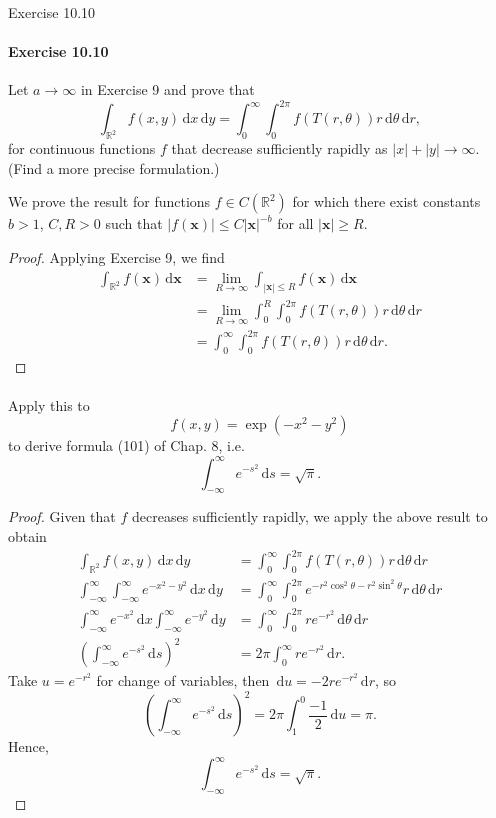 \documentclass[12pt]{article}
\newenvironment{fullbox}{\begin{lrbox}{\savefullbox}\begin{minipage}{\dimexpr\textwidth-2\fboxsep\relax}}{\end{minipage}\end{lrbox}\begin{center}\framebox[\textwidth]{\usebox{\savefullbox}}\end{center}}
\newenvironment{pbox}[1][]{\begin{fullbox}\ifx#1\empty\else\paragraph{#1}\fi}{\end{fullbox}}
\newcommand{\R}{\mathbb{R}}
\newcommand{\<}{\langle}
\renewcommand{\>}{\rangle}
\newcommand{\x}{\mathbf{x}}
\newcommand{\dd}[1]{\,\mathrm{d}#1}
\begin{document}
\newpage
\begin{pbox}[Exercise 10.10]
    Let $a\to \infty$ in Exercise 9 and prove that
    \[
        \int_{\R^2} f(x,y) \dd{x} \dd{y} = \int_{0}^{\infty} \int_{0}^{2\pi} f(T(r,\theta))r \dd{\theta} \dd{r},
    \]
    for continuous functions $f$ that decrease sufficiently rapidly as $|x|+|y|\to \infty$. (Find a more precise formulation.) 
\end{pbox}

We prove the result for functions $f \in C(\R^2)$ for which there exist constants $b > 1$, $C, R > 0$ such that $|f(\x)| \leq C|\x|^{-b}$ for all $|\x| \geq R$.

\begin{proof}
    Applying Exercise 9, we find
    \begin{align*}
        \int_{\R^2} f(\x) \dd{\x}
            &= \lim_{R \to \infty} \int_{|\x| \leq R} f(\x) \dd{\x} \\
            &= \lim_{R \to \infty} \int_{0}^{R} \int_{0}^{2\pi} f(T(r,\theta))r \dd{\theta} \dd{r} \\
            &= \int_{0}^{\infty} \int_{0}^{2\pi} f(T(r,\theta))r \dd{\theta} \dd{r}.
    \end{align*}

\end{proof}



\begin{pbox}
    Apply this to
    \[
        f(x,y) = \exp(-x^2-y^2)
    \]
    to derive formula (101) of Chap. 8, i.e.
    \[
        \int_{-\infty}^{\infty} e^{-s^2} \dd{s} = \sqrt{\pi}.
    \]
\end{pbox}

\begin{proof}
    Given that $f$ decreases sufficiently rapidly, we apply the above result to obtain
    \begin{align*}
        \int_{\R^2} f(x, y) \dd{x} \dd{y} &= \int_{0}^{\infty} \int_{0}^{2\pi} f(T(r,\theta))r \dd{\theta} \dd{r} \\
        \int_{-\infty}^{\infty} \int_{-\infty}^{\infty} e^{-x^2 - y^2} \dd{x} \dd{y} &= \int_{0}^{\infty} \int_{0}^{2\pi} e^{-r^2\cos^2\theta - r^2\sin^2\theta}r \dd{\theta} \dd{r} \\
        \int_{-\infty}^{\infty} e^{-x^2} \dd{x} \int_{-\infty}^{\infty} e^{-y^2} \dd{y} &= \int_{0}^{\infty} \int_{0}^{2\pi} re^{-r^2} \dd{\theta} \dd{r} \\
        \left(\int_{-\infty}^{\infty} e^{-s^2} \dd{s}\right)^2 &= 2\pi \int_{0}^{\infty} re^{-r^2} \dd{r}.
    \end{align*}
    Take $u = e^{-r^2}$ for change of variables, then $\dd{u} = -2re^{-r^2} \dd{r}$, so
    \[
        \left(\int_{-\infty}^{\infty} e^{-s^2} \dd{s}\right)^2 
            = 2\pi \int_{1}^{0} \frac{-1}{2} \dd{u}
            = \pi.
    \]
    Hence,
    \[
        \int_{-\infty}^{\infty} e^{-s^2} \dd{s} = \sqrt{\pi}.
    \]

\end{proof}
\end{document}
